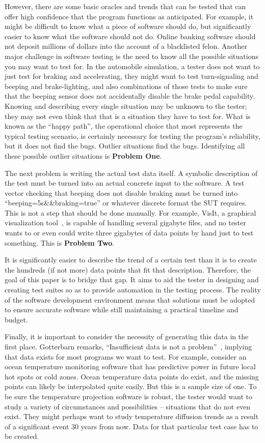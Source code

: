 However, there are some basic oracles and trends that can be tested that can offer high confidence that the program functions as anticipated. For example, it might be difficult to know what a piece of software should do, but significantly easier to know what the software should not do. Online banking software should not deposit millions of dollars into the account of a blacklisted felon.
Another major challenge in software testing is the need to know all the possible situations you may want to test for. In the automobile simulation, a tester does not want to just test for braking and accelerating, they might want to test turn-signaling and beeping and brake-lighting, and also combinations of those tests to make sure that the beeping sensor does not accidentally disable the brake pedal capability. Knowing and describing every single situation may be unknown to the tester; they may not even think that that is a situation they have to test for. What is known as the ``happy path'', the operational choice that most represents the typical testing scenario, is certainly necessary for testing the program’s reliability, but it does not find the bugs. Outlier situations find the bugs. Identifying all these possible outlier situations is \textbf{Problem One}.

The next problem is writing the actual test data itself. A symbolic description of the test must be turned into an actual concrete input to the software. A test vector checking that beeping does not disable braking must be turned into ``beeping=5s\&\&braking=true'' or whatever discrete format the SUT requires. This is not a step that should be done manually. For example, VisIt, a graphical visualization tool~\cite{VisIt}, is capable of handling several gigabyte files, and no tester wants to or even could write three gigabytes of data points by hand just to test something. This is \textbf{Problem Two}.

It is significantly easier to describe the trend of a certain test than it is to create the hundreds (if not more) data points that fit that description. Therefore, the goal of this paper is to bridge that gap. It aims to aid the tester in designing and creating test suites so as to provide automation in the testing process. The reality of the software development environment means that solutions must be adopted to ensure accurate software while still maintaining a practical timeline and budget. 

Finally, it is important to consider the necessity of generating this data in the first place. Gotterbarn remarks, ``Insufficient data is not a problem''~\cite{Gotterbarn:2016:CFC:2874239.2874248}, implying that data exists for most programs we want to test. For example, consider an ocean temperature monitoring software that has predictive power in future local hot spots or cold zones. Ocean temperature data points do exist, and the missing points can likely be interpolated quite easily. But this is a sample size of one. To be sure the temperature projection software is robust, the tester would want to study a variety of circumstances and possibilities – situations that do not even exist. They might perhaps want to study temperature diffusion trends as a result of a significant event 30 years from now. Data for that particular test case has to be created.